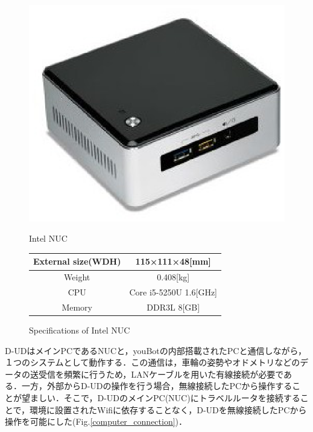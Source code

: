 \documentclass[12pt]{sonota/aislab}
\begin{document}
\begin{figure}
\begin{minipage}{0.4\textwidth}
\begin{center}
\includegraphics[scale=0.45]{figs/intel-nuc.eps}
\caption{Intel NUC}
\label{NUC}
\end{center}
\end{minipage}
\begin{minipage}{0.5\textwidth}
\begin{center}
\makeatletter
\def\@captype{table}
\makeatother
\caption{Specifications of Intel NUC}
	\begin{tabular}[tbp]{|c|c|}
		\hline 
		External size(WDH) & 115×111×48[mm] \\\hline
		Weight & 0.408[kg] \\\hline
		CPU & Core i5-5250U 1.6[GHz] \\\hline
		Memory & DDR3L 8[GB] \\\hline
	\end{tabular}
\label{table:NUC}
\end{center}
\end{minipage}
\end{figure}

D-UDはメインPCであるNUCと，youBotの内部搭載されたPCと通信しながら，１つのシステムとして動作する．この通信は，車輪の姿勢やオドメトリなどのデータの送受信を頻繁に行うため，LANケーブルを用いた有線接続が必要である．一方，外部からD-UDの操作を行う場合，無線接続したPCから操作することが望ましい．そこで，D-UDのメインPC(NUC)にトラベルルータを接続することで，環境に設置されたWifiに依存することなく，D-UDを無線接続したPCから操作を可能にした(Fig.\ref{computer_connection})．
\end{document}
